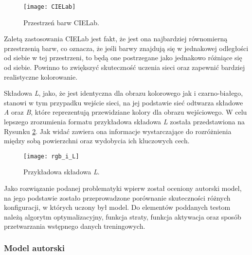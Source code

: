   \begin{figure}
    \centering
    \texttt{[image: CIELab]}
    \caption[Przestrzeń barw CIELab - źródło:
    \url{https://www.flickr.com/photos/greenmambagreenmamba/4236391637}]
    {Przestrzeń barw CIELab.}
    \label{fig:CIELab}
  \end{figure}

  Zaletą zastosowania CIELab jest fakt, że jest ona najbardziej równomierną
  przestrzenią barw, co oznacza, że jeśli barwy znajdują się w jednakowej
  odległości od siebie w tej przestrzeni, to będą one postrzegane jako jednakowo
  różniące się od siebie. Powinno to zwiększyć skuteczność uczenia sieci oraz
  zapewnić bardziej realistyczne kolorowanie.

  Składowa \textit{L}, jako, że jest identyczna dla obrazu kolorowego jak i
  czarno-białego, stanowi w tym przypadku wejście sieci, na jej podstawie sieć
  odtwarza składowe \textit{A} oraz \textit{B}, które reprezentują przewidziane
  kolory dla obrazu wejściowego. W celu lepszego zrozumienia formatu przykładowa
  składowa \textit{L} została przedstawiona na Rysunku \ref{fig:przyklad_L}.
  Jak widać zawiera ona informacje wystarczające do rozróżnienia między sobą
  powierzchni oraz wydobycia ich kluczowych cech.

  \begin{figure}[ht]
    \centering
    \texttt{[image: rgb\_i\_L]}
    \caption[Przykładowa składowa \textit{L} - źródło: Rysunek własny
    wykorzystujący:
    \url{https://fr.m.wikipedia.org/wiki/Fichier:An_F-A-18C_Hornet_launches_from_the_flight_deck_of_the_conventionally_powered_aircraft_carrier.jpg}]
    {Przykładowa składowa \textit{L}.}
    \label{fig:przyklad_L}
  \end{figure}

  Jako rozwiązanie podanej problematyki wpierw został oceniony autorski
  model, na jego podstawie zostało przeprowadzone porównanie skuteczności
  różnych konfiguracji, w których uczony był model. Do elementów poddanych
  testom należą algorytm optymalizacyjny, funkcja straty, funkcja aktywacja oraz
  sposób przetwarzania wstępnego danych treningowych.

\subsubsection{Model autorski} \label{model autorski}

